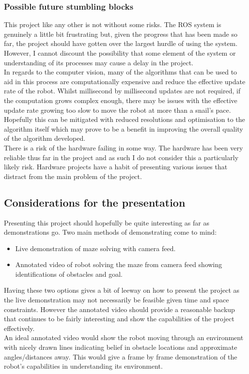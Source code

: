 \documentclass[10pt,a4paper]{report}
\begin{document}
		\subsubsection*{Possible future stumbling blocks}
			This project like any other is not without some risks. The ROS system is genuinely a little bit frustrating but, given the progress that has been made so far, the project should have gotten over the largest hurdle of using the system. However, I cannot discount the possibility that some element of the system or understanding of its processes may cause a delay in the project. \\
			In regards to the computer vision, many of the algorithms that can be used to aid in this process are computationally expensive and reduce the effective update rate of the robot. Whilst millisecond by millisecond updates are not required, if the computation grows complex enough, there may be issues with the effective update rate growing too slow to move the robot at more than a snail's pace. Hopefully this can be mitigated with reduced resolutions and optimisation to the algorithm itself which may prove to be a benefit in improving the overall quality of the algorithm developed. \\
			There is a risk of the hardware failing in some way. The hardware has been very reliable thus far in the project and as such I do not consider this a particularly likely risk. Hardware projects have a habit of presenting various issues that distract from the main problem of the project. 
	\subsection*{Considerations for the presentation}
		Presenting this project should hopefully be quite interesting as far as demonstrations go. Two main methods of demonstrating come to mind: \\
		\begin{itemize}
			\item Live demonstration of maze solving with camera feed.
			\item Annotated video of robot solving the maze from camera feed showing identifications of obstacles and goal.
		\end{itemize}
		Having these two options gives a bit of leeway on how to present the project as the live demonstration may not necessarily be feasible given time and space constraints. However the annotated video should provide a reasonable backup that continues to be fairly interesting and show the capabilities of the project effectively. \\
		An ideal annotated video would show the robot moving through an environment with nicely drawn lines indicating belief in obstacle locations and approximate angles/distances away. This would give a frame by frame demonstration of the robot's capabilities in understanding its environment.
	
\end{document}
